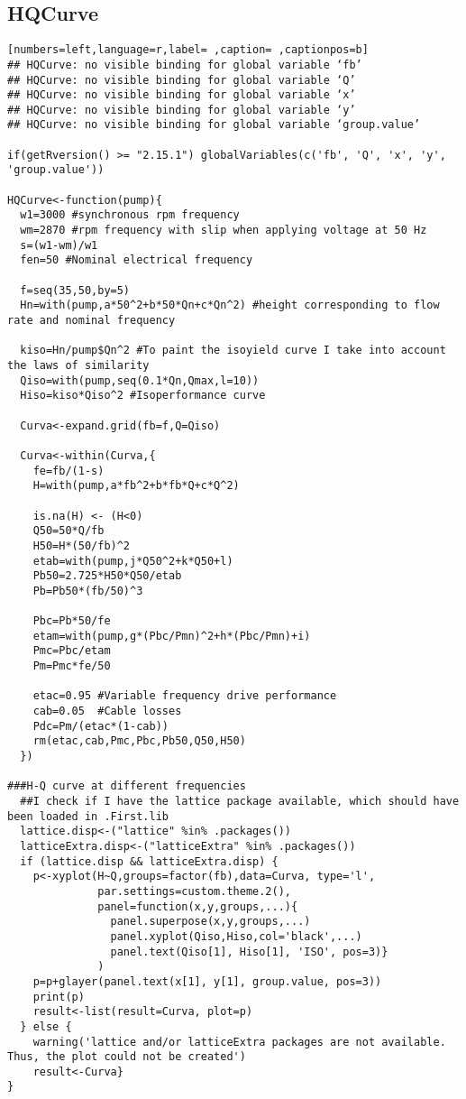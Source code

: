 \subsection{HQCurve}
\label{sec:org6e204d3}
\begin{lstlisting}[numbers=left,language=r,label= ,caption= ,captionpos=b]
## HQCurve: no visible binding for global variable ‘fb’
## HQCurve: no visible binding for global variable ‘Q’
## HQCurve: no visible binding for global variable ‘x’
## HQCurve: no visible binding for global variable ‘y’
## HQCurve: no visible binding for global variable ‘group.value’

if(getRversion() >= "2.15.1") globalVariables(c('fb', 'Q', 'x', 'y', 'group.value'))

HQCurve<-function(pump){
  w1=3000 #synchronous rpm frequency
  wm=2870 #rpm frequency with slip when applying voltage at 50 Hz
  s=(w1-wm)/w1
  fen=50 #Nominal electrical frequency

  f=seq(35,50,by=5)
  Hn=with(pump,a*50^2+b*50*Qn+c*Qn^2) #height corresponding to flow rate and nominal frequency

  kiso=Hn/pump$Qn^2 #To paint the isoyield curve I take into account the laws of similarity
  Qiso=with(pump,seq(0.1*Qn,Qmax,l=10))
  Hiso=kiso*Qiso^2 #Isoperformance curve

  Curva<-expand.grid(fb=f,Q=Qiso)

  Curva<-within(Curva,{
    fe=fb/(1-s)
    H=with(pump,a*fb^2+b*fb*Q+c*Q^2)

    is.na(H) <- (H<0)
    Q50=50*Q/fb
    H50=H*(50/fb)^2
    etab=with(pump,j*Q50^2+k*Q50+l)
    Pb50=2.725*H50*Q50/etab
    Pb=Pb50*(fb/50)^3

    Pbc=Pb*50/fe
    etam=with(pump,g*(Pbc/Pmn)^2+h*(Pbc/Pmn)+i)
    Pmc=Pbc/etam
    Pm=Pmc*fe/50

    etac=0.95 #Variable frequency drive performance
    cab=0.05  #Cable losses
    Pdc=Pm/(etac*(1-cab))
    rm(etac,cab,Pmc,Pbc,Pb50,Q50,H50)
  })

###H-Q curve at different frequencies
  ##I check if I have the lattice package available, which should have been loaded in .First.lib
  lattice.disp<-("lattice" %in% .packages())
  latticeExtra.disp<-("latticeExtra" %in% .packages())
  if (lattice.disp && latticeExtra.disp) {
    p<-xyplot(H~Q,groups=factor(fb),data=Curva, type='l',
              par.settings=custom.theme.2(),
              panel=function(x,y,groups,...){
                panel.superpose(x,y,groups,...)
                panel.xyplot(Qiso,Hiso,col='black',...)
                panel.text(Qiso[1], Hiso[1], 'ISO', pos=3)}
              )
    p=p+glayer(panel.text(x[1], y[1], group.value, pos=3))
    print(p)
    result<-list(result=Curva, plot=p)
  } else {
    warning('lattice and/or latticeExtra packages are not available. Thus, the plot could not be created')
    result<-Curva}
}
\end{lstlisting}
